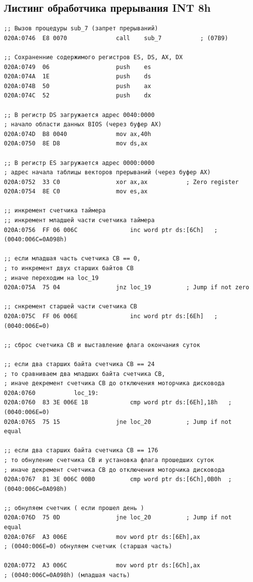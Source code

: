 \documentclass[a4paper,12pt]{article}
\begin{document}
\subsection{Листинг обработчика прерывания INT 8h} 
\begin{lstlisting}[style={asm}]
;; Вызов процедуры sub_7 (запрет прерываний)
020A:0746  E8 0070				call	sub_7			; (07B9)

;; Сохраненние содержимого регистров ES, DS, AX, DX
020A:0749  06					push	es
020A:074A  1E					push	ds
020A:074B  50					push	ax
020A:074C  52					push	dx

;; В регистр DS загружается адрес 0040:0000
; начало области данных BIOS (через буфер AX)
020A:074D  B8 0040				mov	ax,40h
020A:0750  8E D8				mov	ds,ax

;; В регистр ES загружается адрес 0000:0000
; адрес начала таблицы векторов прерываний (через буфер AX)
020A:0752  33 C0				xor	ax,ax			; Zero register
020A:0754  8E C0				mov	es,ax

;; инкремент счетчика таймера
;; инкремент младшей части счетчика таймера
020A:0756  FF 06 006C				inc	word ptr ds:[6Ch]	; (0040:006C=0A098h)

;; если младшая часть счетчика CB == 0, 
; то инкремент двух старших байтов CB
; иначе переходим на loc_19
020A:075A  75 04				jnz	loc_19			; Jump if not zero

;; снкремент старшей части счетчика CB
020A:075C  FF 06 006E				inc	word ptr ds:[6Eh]	; (0040:006E=0)

;; сброс счетчика CB и выставление флага окончания суток

;; если два старших байта счетчика CB == 24
; то сравниваем два младших байта счетчика CB,
; иначе декремент счетчика CB до отключения моторчика дисковода
020A:0760			loc_19:
020A:0760  83 3E 006E 18			cmp	word ptr ds:[6Eh],18h	; (0040:006E=0)
020A:0765  75 15				jne	loc_20			; Jump if not equal

;; если два старших байта счетчика CB == 176
; то обнуление счетчика CB и установка флага прошедших суток
; иначе декремент счетчика CB до отключения моторчика дисковода
020A:0767  81 3E 006C 00B0			cmp	word ptr ds:[6Ch],0B0h	; (0040:006C=0A098h)

;; обнуляем счетчик ( если прошел день )
020A:076D  75 0D				jne	loc_20			; Jump if not equal
020A:076F  A3 006E				mov	word ptr ds:[6Eh],ax	
; (0040:006E=0) обнуляем счетчик (старшая часть)

020A:0772  A3 006C				mov	word ptr ds:[6Ch],ax	
; (0040:006C=0A098h) (младшая часть)


\end{lstlisting}
\end{document}
